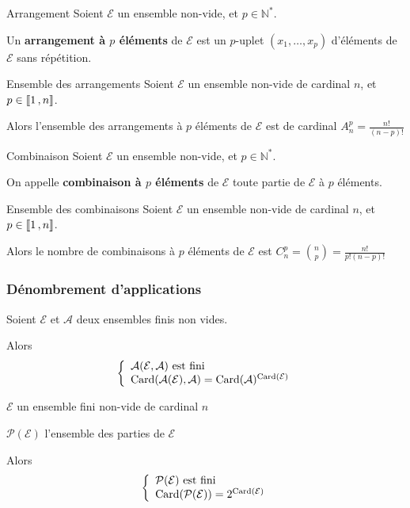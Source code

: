     \begin{defi}{Arrangement}{}
        Soient $\mathcal{E}$ un ensemble non-vide, et $p \in \mathbb{N}^*$.

        Un \textbf{arrangement à $p$ éléments} de $\mathcal{E}$ est un $p$-uplet $(x_1,\ldots,x_p)$ d’éléments de $\mathcal{E}$ sans répétition.
    \end{defi}

    \begin{theo}{Ensemble des arrangements}{}
        Soient $\mathcal{E}$ un ensemble non-vide de cardinal $n$, et $p \in \left\llbracket 1 \, , n \right\rrbracket$.

        Alors l’ensemble des arrangements à $p$ éléments de $\mathcal{E}$ est de cardinal $A_n^p = \frac{n!}{(n-p)!}$
    \end{theo}

    \begin{defi}{Combinaison}{}
        Soient $\mathcal{E}$ un ensemble non-vide, et $p \in \mathbb{N}^*$.

        On appelle \textbf{combinaison à $p$ éléments} de $\mathcal{E}$ toute partie de $\mathcal{E}$ à $p$ éléments.
    \end{defi}

    \begin{theo}{Ensemble des combinaisons}{}
        Soient $\mathcal{E}$ un ensemble non-vide de cardinal $n$, et $p \in \left\llbracket 1 \, , n \right\rrbracket$.

        Alors le nombre de combinaisons à $p$ éléments de $\mathcal{E}$ est  $C_n^p = \binom{n}{p} = \frac{n!}{p!(n-p)!}$
    \end{theo}

    \subsubsection{Dénombrement d’applications}

    \begin{theo}{}{}
        Soient $\mathcal{E}$ et $\mathcal{A}$ deux ensembles finis non vides.

        Alors 
        \[ \et{\mathcal{A}(\mathcal{E},\mathcal{A}) \text{ est fini}}{\card(\mathcal{A}(\mathcal{E}),\mathcal{A}) = \card(\mathcal{A})^{\card(\mathcal{E})}} \]
    \end{theo}

    \begin{coro}{}{}
        \begin{soient}
            \item $\mathcal{E}$ un ensemble fini non-vide de cardinal $n$
            \item $\mathcal{P}(\mathcal{E})$ l’ensemble des parties de $\mathcal{E}$
        \end{soient}
        Alors 
        \[ \et{\mathcal{P}(\mathcal{E}) \text{ est fini}}{\card(\mathcal{P}(\mathcal{E})) = 2^{\card(\mathcal{E})}} \]
    \end{coro}

